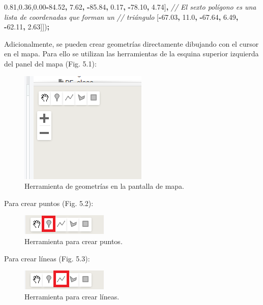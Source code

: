 \documentclass[
  12pt,
  letterpaper,
  twoside]{book}
\newenvironment{Shaded}{\begin{snugshade}}{\end{snugshade}}
\newcommand{\CommentTok}[1]{\textcolor[rgb]{0.56,0.35,0.01}{\textit{#1}}}
\newcommand{\FloatTok}[1]{\textcolor[rgb]{0.00,0.00,0.81}{#1}}
\newcommand{\NormalTok}[1]{#1}
\newcommand{\OperatorTok}[1]{\textcolor[rgb]{0.81,0.36,0.00}{\textbf{#1}}}
\begin{document}
\begin{Shaded}
\begin{Highlighting}[]
\NormalTok{    [}\OperatorTok{{-}}\FloatTok{84.52}\OperatorTok{,} \FloatTok{7.62}\OperatorTok{,}         
     \OperatorTok{{-}}\FloatTok{85.84}\OperatorTok{,} \FloatTok{0.17}\OperatorTok{,}
     \OperatorTok{{-}}\FloatTok{78.10}\OperatorTok{,} \FloatTok{4.74}\NormalTok{]}\OperatorTok{,}
    \CommentTok{// El sexto polígono es una lista de coordenadas que forman un }
    \CommentTok{// triángulo}
\NormalTok{    [}\OperatorTok{{-}}\FloatTok{67.03}\OperatorTok{,} \FloatTok{11.0}\OperatorTok{,}         
     \OperatorTok{{-}}\FloatTok{67.64}\OperatorTok{,} \FloatTok{6.49}\OperatorTok{,}
     \OperatorTok{{-}}\FloatTok{62.11}\OperatorTok{,} \FloatTok{2.63}\NormalTok{]])}\OperatorTok{;}
\end{Highlighting}
\end{Shaded}

Adicionalmente, se pueden crear geometrías directamente dibujando con el cursor en el mapa. Para ello se utilizan las herramientas de la esquina superior izquierda del panel del mapa (Fig. 5.1):

\begin{figure}[btp]

{\centering \includegraphics[width=0.3\linewidth]{Img/geometrias} 

}

\caption{Herramienta de geometrías en la pantalla de mapa.}\label{fig:unnamed-chunk-53}
\end{figure}

Para crear puntos (Fig. 5.2):

\begin{figure}[btp]

{\centering \includegraphics[width=0.2\linewidth]{Img/punto} 

}

\caption{Herramienta para crear puntos.}\label{fig:unnamed-chunk-54}
\end{figure}

Para crear líneas (Fig. 5.3):

\begin{figure}[btp]

{\centering \includegraphics[width=0.2\linewidth]{Img/linea} 

}

\caption{Herramienta para crear líneas.}\label{fig:unnamed-chunk-55}
\end{figure}
\end{document}
